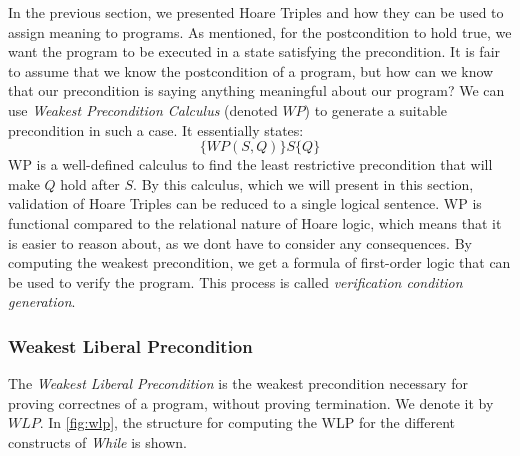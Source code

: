 In the previous section, we presented Hoare Triples and how they can be used to assign meaning to programs. 
As mentioned, for the postcondition to hold true, we want the program to be executed in a state satisfying the precondition. 
It is fair to assume that we know the postcondition of a program, but how can we know that our precondition is saying anything meaningful about our program? 
We can use \textit{Weakest Precondition Calculus} (denoted $WP$) to generate a suitable precondition in such a case.
It essentially states:
$$
\{WP(S,Q)\}S\{Q\}
$$
WP is a well-defined calculus to find the least restrictive precondition that will make $Q$ hold after $S$. 
By this calculus, which we will present in this section, validation of Hoare Triples can be reduced to a single logical sentence. WP is functional compared to the relational nature of Hoare logic, which means that it is easier to reason about, as we dont have to consider any consequences.
By computing the weakest precondition, we get a formula of first-order logic that can be used to verify the program. This process is called \textit{verification condition generation}.

\subsubsection{Weakest Liberal Precondition}
The \textit{Weakest Liberal Precondition} is the weakest precondition necessary for proving correctnes of a program, without proving termination. We denote it by $WLP$.
In \cref{fig:wlp}, the structure for computing the WLP for the different constructs of \textit{While} is shown.

